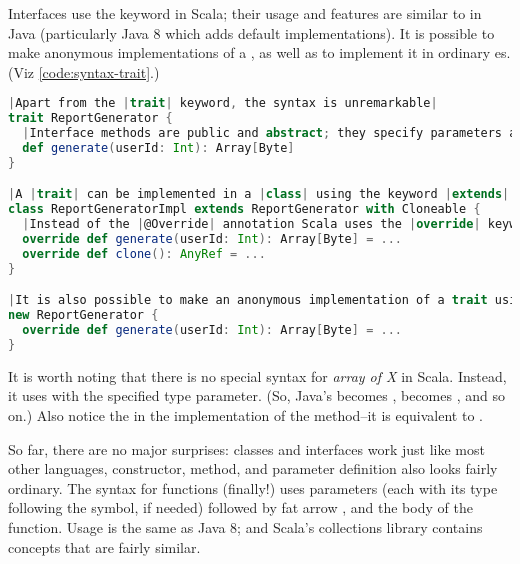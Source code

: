 \documentclass[10 pt]{article}
\begin{document}
Interfaces use the  keyword in Scala; their usage and features are similar to  in Java (particularly Java 8 which adds default implementations). It is possible to make anonymous implementations of a , as well as to implement it in ordinary es. (Viz \autoref{code:syntax-trait}.)

\begin{lstlisting}[caption={Traits}, label={code:syntax-trait}, language=Scala, escapechar=|]
|Apart from the |trait| keyword, the syntax is unremarkable|
trait ReportGenerator {
  |Interface methods are public and abstract; they specify parameters and return type|
  def generate(userId: Int): Array[Byte]
}

|A |trait| can be implemented in a |class| using the keyword |extends|. Additional traits to be implemented use the |with| keyword.|
class ReportGeneratorImpl extends ReportGenerator with Cloneable {
  |Instead of the |@Override| annotation Scala uses the |override| keyword.|
  override def generate(userId: Int): Array[Byte] = ...
  override def clone(): AnyRef = ...
}

|It is also possible to make an anonymous implementation of a trait using the |new| keyword.|
new ReportGenerator {
  override def generate(userId: Int): Array[Byte] = ...
}
\end{lstlisting}

It is worth noting that there is no special syntax for \emph{array of X} in Scala. Instead, it uses  with the specified type parameter. (So, Java's  becomes ,  becomes , and so on.) Also notice the  in the implementation of the  method--it is equivalent to .

So far, there are no major surprises: classes and interfaces work just like most other languages, constructor, method, and parameter definition also looks fairly ordinary. The syntax for functions (finally!) uses parameters (each with its type following the \pcode{:} symbol, if needed) followed by fat arrow \pcode{=>}, and the body of the function. Usage is the same as Java 8; and Scala's collections library contains concepts that are fairly similar.
\end{document}

